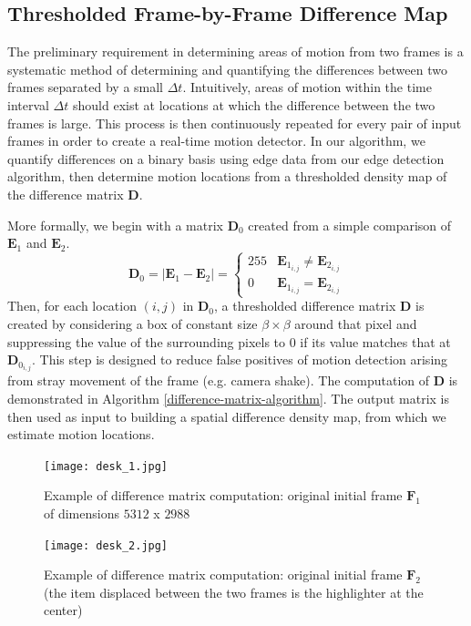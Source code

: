 \documentclass[journal]{IEEEtran}
\begin{document}
\subsection{Thresholded Frame-by-Frame Difference Map}
The preliminary requirement in determining areas of motion from two frames is a systematic method of determining and quantifying the differences between two frames separated by a small $\Delta t$. Intuitively, areas of motion within the time interval $\Delta t$ should exist at locations at which the difference between the two frames is large. This process is then continuously repeated for every pair of input frames in order to create a real-time motion detector. In our algorithm, we quantify differences on a binary basis using edge data from our edge detection algorithm, then determine motion locations from a thresholded density map of the difference matrix $\boldsymbol{D}$.
\par More formally, we begin with a matrix $\boldsymbol{D}_0$ created from a simple comparison of $\boldsymbol{E}_1$ and $\boldsymbol{E}_2$.
\[
\boldsymbol{D}_0 = |\boldsymbol{E}_1 - \boldsymbol{E}_2| =
\begin{cases}
	255 & \boldsymbol{E}_{1_{i, j}} \neq \boldsymbol{E}_{2_{i, j}} \\
	0 & \boldsymbol{E}_{1_{i, j}} = \boldsymbol{E}_{2_{i, j}}
\end{cases}
\]
Then, for each location $(i, j)$ in $\boldsymbol{D}_0$, a thresholded difference matrix $\boldsymbol{D}$ is created by considering a box of constant size $\beta \times \beta$ around that pixel and suppressing the value of the surrounding pixels to 0 if its value matches that at $\boldsymbol{D}_{0_{i, j}}$. This step is designed to reduce false positives of motion detection arising from stray movement of the frame (e.g. camera shake). The computation of $\boldsymbol{D}$ is demonstrated in Algorithm \ref{difference-matrix-algorithm}. The output matrix is then used as input to building a spatial difference density map, from which we estimate motion locations.
\begin{figure}[H]
	\centering
	\texttt{[image: desk\_1.jpg]}
	\caption{Example of difference matrix computation: original initial frame $\boldsymbol{F}_1$ of dimensions $5312$ x $2988$}
    \label{desk-1-original}
\end{figure}
\begin{figure}[H]
	\centering
	\texttt{[image: desk\_2.jpg]}
	\caption{Example of difference matrix computation: original initial frame $\boldsymbol{F}_2$ (the item displaced between the two frames is the highlighter at the center)}
    \label{desk-2-original}
\end{figure}
\end{document}
